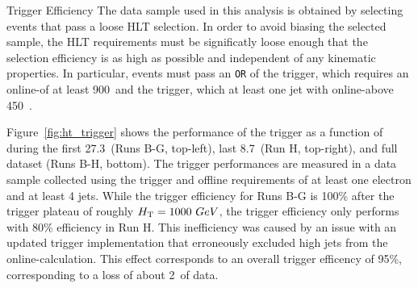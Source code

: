 \begin{section}{Trigger Efficiency}
The data sample used in this analysis is obtained by selecting events that pass a loose HLT selection.
In order to avoid biasing the selected sample, the HLT requirements must be significatly loose enough that the selection efficiency is as high as possible and independent of any kinematic properties.
In particular, events must pass an \texttt{OR} of the \trigHT trigger, which requires an online-\HT of at least 900~\GeV and the \trigJet trigger, which at least one jet with online-\pT above 450~\GeV.

Figure~\ref{fig:ht_trigger} shows the performance of the \trigHT trigger as a function of \HT during the first 27.3~\ifb (Runs B-G, top-left), last 8.7~\ifb (Run H, top-right), and full dataset (Runs B-H, bottom).
The trigger performances are measured in a data sample collected using the \trigEle trigger and offline requirements of at least one electron and at least 4 jets.
While the trigger efficiency for Runs B-G is 100\% after the trigger plateau of roughly $H_{\mathrm{T}} = 1000~GeV$, the trigger efficiency only performs with 80\% efficiency in Run H.
This inefficiency was caused by an issue with an updated trigger implementation that erroneously excluded high \pT jets from the online-\HT calculation.
This effect corresponds to an overall trigger efficency of 95\%, corresponding to a loss of about 2~\ifb of data.


\end{section}
